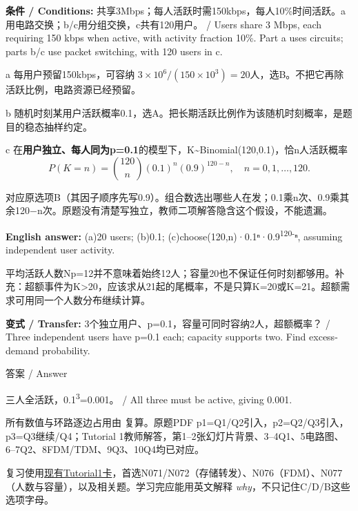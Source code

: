

\textbf{条件 / Conditions:} 共享3Mbps；每人活跃时需150kbps，每人10\%时间活跃。a用电路交换；b/c用分组交换，c共有120用户。 / Users share 3 Mbps, each requiring 150 kbps when active, with activity fraction 10\%. Part a uses circuits; parts b/c use packet switching, with 120 users in c.




a 每用户预留150kbps，可容纳 \(3\times10^6/(150\times10^3)=20\)人，选B。不把它再除活跃比例，电路资源已经预留。


b 随机时刻某用户活跃概率0.1，选A。把长期活跃比例作为该随机时刻概率，是题目的稳态抽样约定。


c 在\textbf{用户独立、每人同为p=0.1}的模型下，K\textasciitilde{}Binomial(120,0.1)，恰n人活跃概率
\[
P(K=n)=\binom{120}{n}(0.1)^n(0.9)^{120-n},\quad n=0,1,\ldots,120.\tag{T1.2}
\]


对应原选项B（其因子顺序先写0.9）。组合数选出哪些人在发；0.1乘n次、0.9乘其余120\ensuremath{-}n次。原题没有清楚写独立，教师二项解答隐含这个假设，不能遗漏。


\textbf{English answer:} (a)20 users; (b)0.1; (c)choose(120,n)·0.1ⁿ·0.9\textsuperscript{1}\textsuperscript{2}\textsuperscript{0}\textsuperscript{-}ⁿ, assuming independent user activity.


平均活跃人数Np=12并不意味着始终12人；容量20也不保证任何时刻都够用。补充：超额事件为K>20，应该求从21起的尾概率，不是只算K=20或K=21。超额需求可用同一个人数分布继续计算。


\textbf{变式 / Transfer:} 3个独立用户、p=0.1，容量可同时容纳2人，超额概率？ / Three independent users have p=0.1 each; capacity supports two. Find excess-demand probability.



\begin{StudySolution}{答案 / Answer}


三人全活跃，0.1\textsuperscript{3}=0.001。 / All three must be active, giving 0.001.


\end{StudySolution}





所有数值与环路逐边占用由  复算。原题PDF p1=Q1/Q2引入，p2=Q2/Q3引入，p3=Q3继续/Q4；Tutorial 1教师解答，第1–2张幻灯片背景、3–4Q1、5电路图、6–7Q2、8FDM/TDM、9Q3、10Q4均已对应。


复习使用\href{https://crazyshout.github.io/micro-course/cards.html\#CS5222-N071}{现有Tutorial1卡}，首选N071/N072（存储转发）、N076（FDM）、N077（人数与容量），以及相关题。学习完应能用英文解释 \emph{why}，不只记住C/D/B这些选项字母。
